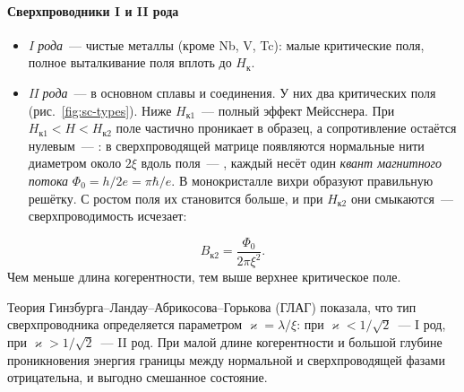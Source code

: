 \paragraph{Сверхпроводники I и II рода}
\begin{itemize}
\item \emph{I рода}~— чистые металлы (кроме Nb, V, Tc): малые
критические поля, полное выталкивание поля вплоть до $H_\text{к}$.
\item \emph{II рода}~— в основном сплавы и соединения. У них два
критических поля (рис.~\ref{fig:sc-types}). Ниже $H_\text{к1}$~— полный
эффект Мейсснера. При $H_\text{к1}<H<H_\text{к2}$ поле частично проникает
в образец, а сопротивление остаётся нулевым~— : в сверхпроводящей матрице появляются нормальные нити
диаметром около $2\xi$ вдоль поля~— , каждый несёт один
\emph{квант магнитного потока} $\Phi_0=h/2e=\pi\hbar/e$. В монокристалле
вихри образуют правильную решётку. С ростом поля их становится больше,
и при $H_\text{к2}$ они смыкаются~— сверхпроводимость
исчезает:
\end{itemize}
\begin{equation}\label{eq:Hc2}
B_\text{к2}=\frac{\Phi_0}{2\pi\xi^2}.
\end{equation}
Чем меньше длина
когерентности, тем выше верхнее критическое поле.

Теория Гинзбурга--Ландау--Абрикосова--Горькова (ГЛАГ) показала, что тип
сверхпроводника определяется параметром $\varkappa=\lambda/\xi$: при
$\varkappa<1/\sqrt2$~— I род, при $\varkappa>1/\sqrt2$~— II род. При
малой длине когерентности и большой глубине проникновения энергия
границы между нормальной и сверхпроводящей фазами отрицательна, и
выгодно смешанное состояние.

